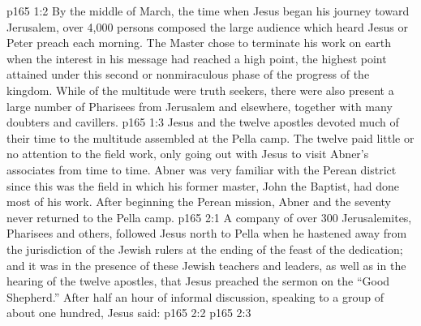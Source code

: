 \vs p165 1:2 By the middle of March, the time when Jesus began his journey toward Jerusalem, over 4,000 persons composed the large audience which heard Jesus or Peter preach each morning. The Master chose to terminate his work on earth when the interest in his message had reached a high point, the highest point attained under this second or nonmiraculous phase of the progress of the kingdom. While  of the multitude were truth seekers, there were also present a large number of Pharisees from Jerusalem and elsewhere, together with many doubters and cavillers.
\vs p165 1:3 Jesus and the twelve apostles devoted much of their time to the multitude assembled at the Pella camp. The twelve paid little or no attention to the field work, only going out with Jesus to visit Abner’s associates from time to time. Abner was very familiar with the Perean district since this was the field in which his former master, John the Baptist, had done most of his work. After beginning the Perean mission, Abner and the seventy never returned to the Pella camp.
\vs p165 2:1 A company of over 300 Jerusalemites, Pharisees and others, followed Jesus north to Pella when he hastened away from the jurisdiction of the Jewish rulers at the ending of the feast of the dedication; and it was in the presence of these Jewish teachers and leaders, as well as in the hearing of the twelve apostles, that Jesus preached the sermon on the “Good Shepherd.” After half an hour of informal discussion, speaking to a group of about one hundred, Jesus said:
\vs p165 2:2 \pc {}
\vs p165 2:3 
